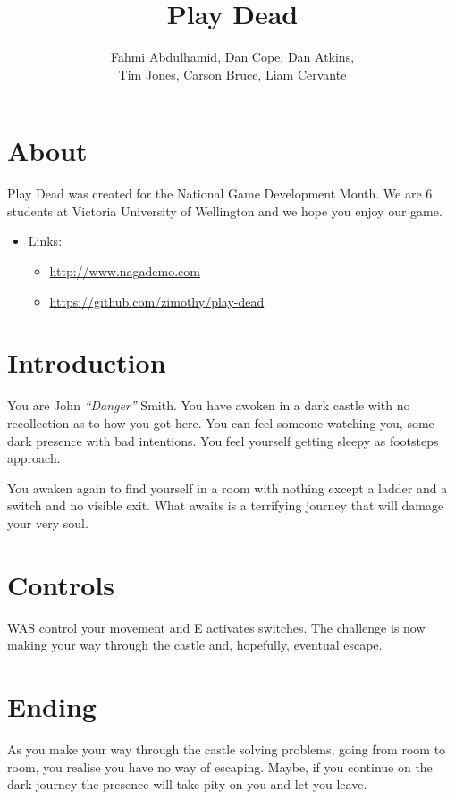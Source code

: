 \documentclass{article}
\title{Play Dead}
\author{Fahmi Abdulhamid, Dan Cope, Dan Atkins,\\Tim Jones, Carson Bruce, Liam Cervante}
\begin{document}
 \maketitle
 
 \section{About}Play Dead was created for the National Game Development Month. We are 6 students at Victoria University of Wellington and we hope you enjoy our game.
 \begin{itemize}
  \item Links:
  \begin{itemize}
   \item \url{http://www.nagademo.com}
   \item \url{https://github.com/zimothy/play-dead}
  \end{itemize}
 \end{itemize}
 
 \section{Introduction}
 
 You are John \emph{``Danger''} Smith. You have awoken in a dark castle with no recollection as to how you got here. You can feel someone watching you, some dark presence with bad intentions. You feel yourself getting sleepy as footsteps approach.
 
 You awaken again to find yourself in a room with nothing except a ladder and a switch and no visible exit. What awaits is a terrifying journey that will damage your very soul.
 
 \section{Controls}
 
 WAS control your movement and E activates switches. The challenge is now making your way through the castle and, hopefully, eventual escape.
 
 \section{Ending}
 
 As you make your way through the castle solving problems, going from room to room, you realise you have no way of escaping. Maybe, if you continue on the dark journey the presence will take pity on you and let you leave.
\end{document}
